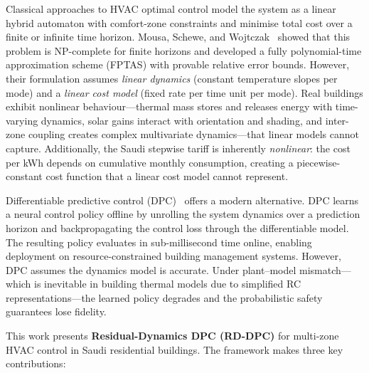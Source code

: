 \documentclass[12pt]{article}
\theoremstyle{plain}
\theoremstyle{definition}
\begin{document}
Classical approaches to HVAC optimal control model the system as a linear hybrid automaton with comfort-zone constraints and minimise total cost over a finite or infinite time horizon. Mousa, Schewe, and Wojtczak~\cite{mousa2018optimal} showed that this problem is NP-complete for finite horizons and developed a fully polynomial-time approximation scheme (FPTAS) with provable relative error bounds. However, their formulation assumes \emph{linear dynamics} (constant temperature slopes per mode) and a \emph{linear cost model} (fixed rate per time unit per mode). Real buildings exhibit nonlinear behaviour---thermal mass stores and releases energy with time-varying dynamics, solar gains interact with orientation and shading, and inter-zone coupling creates complex multivariate dynamics---that linear models cannot capture. Additionally, the Saudi stepwise tariff is inherently \emph{nonlinear}: the cost per kWh depends on cumulative monthly consumption, creating a piecewise-constant cost function that a linear cost model cannot represent.

Differentiable predictive control (DPC)~\cite{drgona2024dpc,drgona2022dpc_jpc} offers a modern alternative. DPC learns a neural control policy offline by unrolling the system dynamics over a prediction horizon and backpropagating the control loss through the differentiable model. The resulting policy evaluates in sub-millisecond time online, enabling deployment on resource-constrained building management systems. However, DPC assumes the dynamics model is accurate. Under plant--model mismatch---which is inevitable in building thermal models due to simplified RC representations---the learned policy degrades and the probabilistic safety guarantees lose fidelity.

This work presents \textbf{Residual-Dynamics DPC (RD-DPC)} for multi-zone HVAC control in Saudi residential buildings. The framework makes three key contributions:
\end{document}
